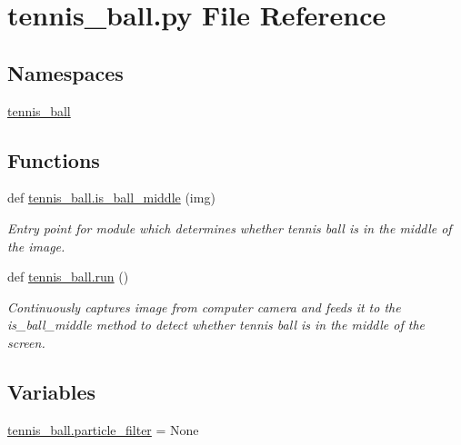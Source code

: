 \section{tennis\+\_\+ball.\+py File Reference}
\label{tennis__ball_8py}
\subsection*{Namespaces}
\begin{DoxyCompactItemize}
\item 
 \hyperlink{namespacetennis__ball}{tennis\+\_\+ball}
\end{DoxyCompactItemize}
\subsection*{Functions}
\begin{DoxyCompactItemize}
\item 
def \hyperlink{namespacetennis__ball_a595850f165f1ae2c78218d580854bfda}{tennis\+\_\+ball.\+is\+\_\+ball\+\_\+middle} (img)
\begin{DoxyCompactList}\small\item\em Entry point for module which determines whether tennis ball is in the middle of the image. \end{DoxyCompactList}\item 
def \hyperlink{namespacetennis__ball_af2aced0030d28f7b0b98175dd3a3d97c}{tennis\+\_\+ball.\+run} ()
\begin{DoxyCompactList}\small\item\em Continuously captures image from computer camera and feeds it to the is\+\_\+ball\+\_\+middle method to detect whether tennis ball is in the middle of the screen. \end{DoxyCompactList}\end{DoxyCompactItemize}
\subsection*{Variables}
\begin{DoxyCompactItemize}
\item 
\hyperlink{namespacetennis__ball_aba3913b89ed8c5fae700b6dfbca98f05}{tennis\+\_\+ball.\+particle\+\_\+filter} = None
\end{DoxyCompactItemize}
